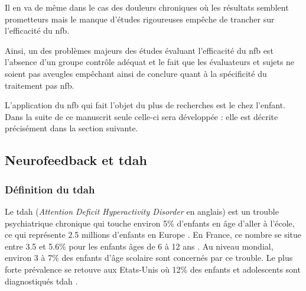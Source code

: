 Il en va de même dans le cas des douleurs chroniques où les résultats semblent prometteurs \citep{Mayaud2019} mais le manque d'études rigoureuses empêche de
trancher sur l'efficacité du \gls{nfb}.

Ainsi, un des problèmes majeurs des études évaluant l'efficacité du \gls{nfb} est l'absence d'un groupe contrôle adéquat et le fait que les évaluateurs et sujets
ne soient pas aveugles \citep{Thibault2017, Thibault2017climate} empêchant ainsi de conclure quant à la spécificité du traitement pas \gls{nfb}.

L'application du \gls{nfb} qui fait l'objet du plus de recherches est le  chez l'enfant. Dans la suite de ce manuscrit seule 
celle-ci sera développée : elle est décrite précisément dans la section suivante.

\subsection{Neurofeedback et \gls{tdah}} \label{nfb_and_adhd}

\subsubsection{Définition du \gls{tdah}}

Le \gls{tdah} (\textit{Attention Deficit Hyperactivity Disorder} en anglais) est un trouble psychiatrique chronique qui touche environ 5\% d'enfants en âge d'aller à l'école, 
ce qui représente 2.5 millions d'enfants en Europe \citep{DSM-5}. En France, ce nombre se situe entre 3.5 et 5.6\% pour les enfants âges de 6 à 12 ans \citep{Lecendreux2011}. 
Au niveau mondial, environ 3 à 7\% des enfants d'âge scolaire sont concernés par ce trouble. Le plus forte prévalence se retouve aux Etats-Unis où 12\% des enfants et adolescents
sont diagnostiqués \gls{tdah} \citep{Collins2016}.

